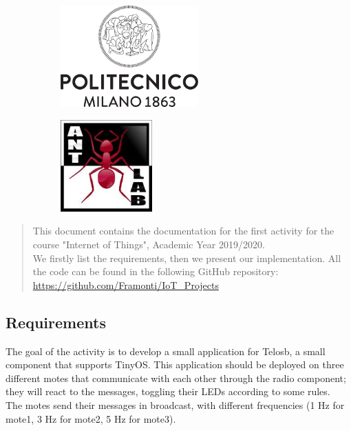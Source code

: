 \documentclass[12pt]{article}
\begin{document}
\begin{titlepage}

\begin{figure}[h]
	\begin{subfigure}{0.5\textwidth}
		\includegraphics[width=150pt, left]{Logo_Politecnico_Milano.png}
	\end{subfigure} 
	\begin{subfigure}{0.5\textwidth}
		\includegraphics[width=100pt, right]{Ant_Lab_Logo.png}
	\end{subfigure}
\end{figure} 
 

\vfill

\end{titlepage}
\begin{abstract}
This document contains the documentation for the first activity for the course "Internet of Things", Academic Year 2019/2020. \\
We firstly list the requirements, then we present our implementation. All the code can be found in the following GitHub repository: \url{https://github.com/Framonti/IoT_Projects}
\end{abstract}
\subsection{Requirements}
The goal of the activity is to develop a small application for Telosb, a small component that supports TinyOS. This application should be deployed on three different motes that communicate with each other through the radio component; they will react to the messages, toggling their LEDs according to some rules.\\
The motes send their messages in broadcast, with different frequencies (1 Hz for mote1, 3 Hz for mote2, 5 Hz for mote3).
\end{document}
